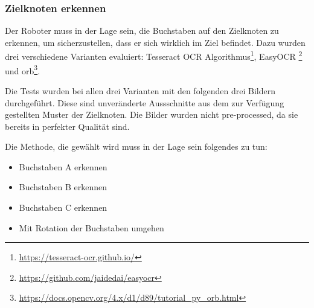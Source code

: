 \subsubsection{Zielknoten erkennen}

Der Roboter muss in der Lage sein, die Buchstaben auf den Zielknoten zu erkennen, um sicherzustellen, dass er sich wirklich im Ziel befindet. Dazu wurden drei verschiedene Varianten evaluiert: Tesseract OCR Algorithmus\footnote{\url{https://tesseract-ocr.github.io/}}, EasyOCR \footnote{\url{https://github.com/jaidedai/easyocr}} und \acrfull{orb}\footnote{\url{https://docs.opencv.org/4.x/d1/d89/tutorial_py_orb.html}}.

Die Tests wurden bei allen drei Varianten mit den folgenden drei Bildern durchgeführt. Diese sind unveränderte Aussschnitte aus dem zur Verfügung gestellten Muster der Zielknoten. Die Bilder wurden nicht pre-processed, da sie bereits in perfekter Qualität sind.

Die Methode, die gewählt wird muss in der Lage sein folgendes zu tun:

\begin{itemize}
    \item Buchstaben A erkennen
    \item Buchstaben B erkennen
    \item Buchstaben C erkennen
    \item Mit Rotation der Buchstaben umgehen
\end{itemize}

